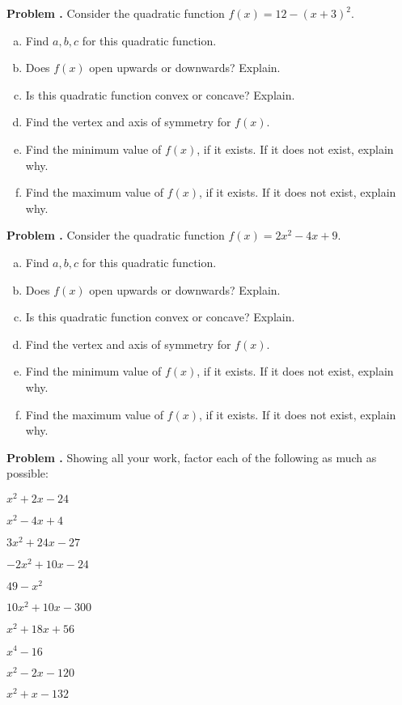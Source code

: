 \documentclass[11pt,letterpaper]{article}
\newcounter{problem}
\newcommand{\prob}{\stepcounter{problem}%
\noindent\textbf{Problem \theproblem. }}
\newenvironment{2enumerate}{%
	\begin{enumerate}[(a)]
	\begin{multicols}{2}
	}{%
	\end{multicols}
	\end{enumerate}
}
\newcommand{\pspace}{\par\vspace{\baselineskip}}
\begin{document}
\prob Consider the quadratic function $f(x)= 12 - (x + 3)^2$.
	\begin{enumerate}[(a)]
	\item Find $a, b, c$ for this quadratic function.
	\item Does $f(x)$ open upwards or downwards? Explain.
	\item Is this quadratic function convex or concave? Explain. 
	\item Find the vertex and axis of symmetry for $f(x)$.
	\item Find the minimum value of $f(x)$, if it exists. If it does not exist, explain why.  
	\item Find the maximum value of $f(x)$, if it exists. If it does not exist, explain why. 
	\end{enumerate} \pspace



\prob Consider the quadratic function $f(x)= 2x^2 - 4x + 9$.
	\begin{enumerate}[(a)]
	\item Find $a, b, c$ for this quadratic function.
	\item Does $f(x)$ open upwards or downwards? Explain.
	\item Is this quadratic function convex or concave? Explain. 
	\item Find the vertex and axis of symmetry for $f(x)$.
	\item Find the minimum value of $f(x)$, if it exists. If it does not exist, explain why.  
	\item Find the maximum value of $f(x)$, if it exists. If it does not exist, explain why. 
	\end{enumerate} \pspace



\prob Showing all your work, factor each of the following as much as possible:
	\begin{2enumerate}
	\item $x^2 + 2x - 24$
	\item $x^2 - 4x + 4$
	\item $3x^2 + 24x - 27$
	\item $-2x^2 + 10x - 24$
	\item $49 - x^2$
	\item $10x^2 + 10x - 300$
	\item $x^2 + 18x + 56$
	\item $x^4 - 16$
	\item $x^2 - 2x - 120$
	\item $x^2 + x - 132$
	\end{2enumerate} \pspace
\end{document}
